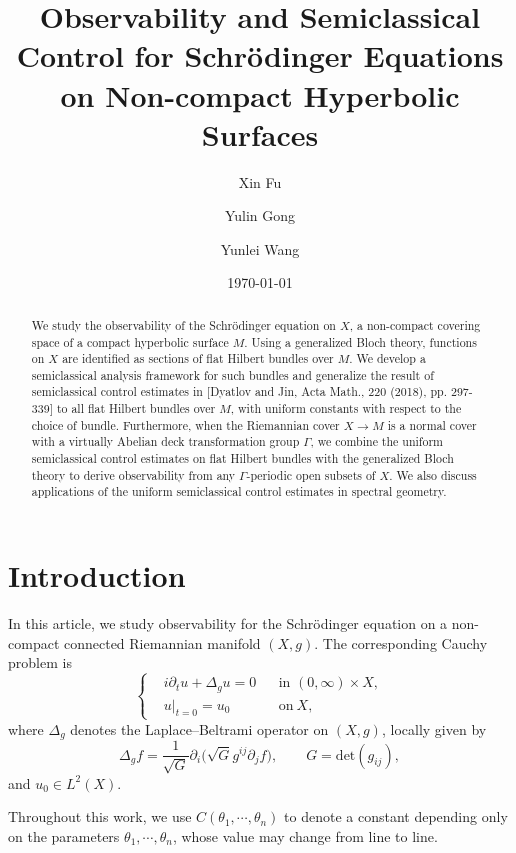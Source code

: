 \documentclass[11pt,oneside,reqno]{amsart}
\title[Observability and Semiclassical Control for Schrödinger Equations]{Observability and Semiclassical Control for Schrödinger Equations on Non-compact Hyperbolic Surfaces}
\author[X.~Fu]{Xin Fu}
\author[Y.~Gong]{Yulin Gong}
\author[Y. Wang]{Yunlei Wang}
\date{\today}
\theoremstyle{definition}
\numberwithin{equation}{section}
\theoremstyle{plain}
\begin{document}
\begin{abstract}
We study the observability of the Schrödinger equation on $X$, a non-compact covering space of a compact hyperbolic surface $M$. Using a generalized Bloch theory, functions on $X$ are identified as sections of flat Hilbert bundles over $M$. We develop a semiclassical analysis framework for such bundles and generalize the result of semiclassical control estimates in [Dyatlov and Jin, Acta Math., 220 (2018), pp. 297-339] to all flat Hilbert bundles over $M$, with uniform constants with respect to the choice of bundle. Furthermore, when the Riemannian cover $X \to M$ is a normal cover with a virtually Abelian deck transformation group $\Gamma$, we combine the uniform semiclassical control estimates on flat Hilbert bundles with the generalized Bloch theory to derive observability from any $\Gamma$-periodic open subsets of $X$. We also discuss applications of the uniform semiclassical control estimates in spectral geometry.
\end{abstract}

\maketitle
\vspace{-1em}
\tableofcontents


\section{Introduction}
In this article, we study observability for the Schrödinger equation on a non-compact connected Riemannian manifold $(X,g)$. The corresponding Cauchy problem is
\begin{equation}\label{Schrödinger}
\left\{\begin{aligned}
    &i\partial_t u +\Delta_g  u =0 && \text{in } (0,\infty)\times X,\\
    &u|_{t=0}=u_0 && \mathrm{on}\  X,
\end{aligned}\right.
\end{equation}
where $\Delta_g$ denotes the Laplace–Beltrami operator on $(X,g)$, locally given by
\begin{equation*}
    \Delta_g f=\frac{1}{\sqrt{G}}\partial_i\big( \sqrt{G}g^{ij}\partial_j f\big), \qquad G=\mathrm{det}(g_{ij}),
\end{equation*}
and $u_0\in L^2(X)$. 

Throughout this work, we use $C(\theta_1,\cdots,\theta_n)$ to denote a constant depending only on the parameters $\theta_1,\cdots,\theta_n$, whose value may change from line to line.
\end{document}
